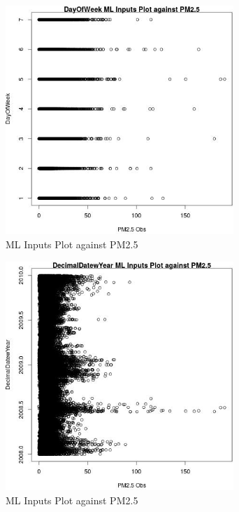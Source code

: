 \begin{figure} 
\centering  
\includegraphics[width=0.77\textwidth]{Code_Outputs/Report_ML_input_PM25_Step4_part_e_de_duplicated_aves_DayOfWeekvPM25_Obs.jpg} 
\caption{\label{fig:Report_ML_input_PM25_Step4_part_e_de_duplicated_avesDayOfWeekvPM25_Obs}ML Inputs Plot against PM2.5} 
\end{figure} 
 

\begin{figure} 
\centering  
\includegraphics[width=0.77\textwidth]{Code_Outputs/Report_ML_input_PM25_Step4_part_e_de_duplicated_aves_DecimalDatewYearvPM25_Obs.jpg} 
\caption{\label{fig:Report_ML_input_PM25_Step4_part_e_de_duplicated_avesDecimalDatewYearvPM25_Obs}ML Inputs Plot against PM2.5} 
\end{figure} 
 

